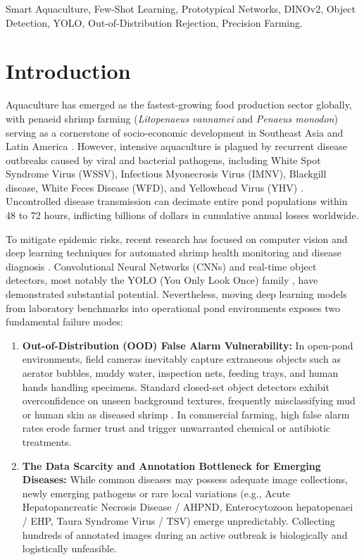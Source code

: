 \documentclass[conference]{IEEEtran}
\begin{document}
\begin{IEEEkeywords}
Smart Aquaculture, Few-Shot Learning, Prototypical Networks, DINOv2, Object Detection, YOLO, Out-of-Distribution Rejection, Precision Farming.
\end{IEEEkeywords}

\section{Introduction}

Aquaculture has emerged as the fastest-growing food production sector globally, with penaeid shrimp farming (\textit{Litopenaeus vannamei} and \textit{Penaeus monodon}) serving as a cornerstone of socio-economic development in Southeast Asia and Latin America \cite{fao2022}. However, intensive aquaculture is plagued by recurrent disease outbreaks caused by viral and bacterial pathogens, including White Spot Syndrome Virus (WSSV), Infectious Myonecrosis Virus (IMNV), Blackgill disease, White Feces Disease (WFD), and Yellowhead Virus (YHV) \cite{lightner2011status, stentiford2012disease}. Uncontrolled disease transmission can decimate entire pond populations within 48 to 72 hours, inflicting billions of dollars in cumulative annual losses worldwide.

To mitigate epidemic risks, recent research has focused on computer vision and deep learning techniques for automated shrimp health monitoring and disease diagnosis \cite{shete2020deep, zhang2021automated}. Convolutional Neural Networks (CNNs) and real-time object detectors, most notably the YOLO (You Only Look Once) family \cite{redmon2016you, jocher2024yolo}, have demonstrated substantial potential. Nevertheless, moving deep learning models from laboratory benchmarks into operational pond environments exposes two fundamental failure modes:

\begin{enumerate}
    \item \textbf{Out-of-Distribution (OOD) False Alarm Vulnerability:} In open-pond environments, field cameras inevitably capture extraneous objects such as aerator bubbles, muddy water, inspection nets, feeding trays, and human hands handling specimens. Standard closed-set object detectors exhibit overconfidence on unseen background textures, frequently misclassifying mud or human skin as diseased shrimp \cite{vaze2022open}. In commercial farming, high false alarm rates erode farmer trust and trigger unwarranted chemical or antibiotic treatments.
    \item \textbf{The Data Scarcity and Annotation Bottleneck for Emerging Diseases:} While common diseases may possess adequate image collections, newly emerging pathogens or rare local variations (e.g., Acute Hepatopancreatic Necrosis Disease / AHPND, Enterocytozoon hepatopenaei / EHP, Taura Syndrome Virus / TSV) emerge unpredictably. Collecting hundreds of annotated images during an active outbreak is biologically and logistically unfeasible. 
\end{enumerate}
\end{document}
